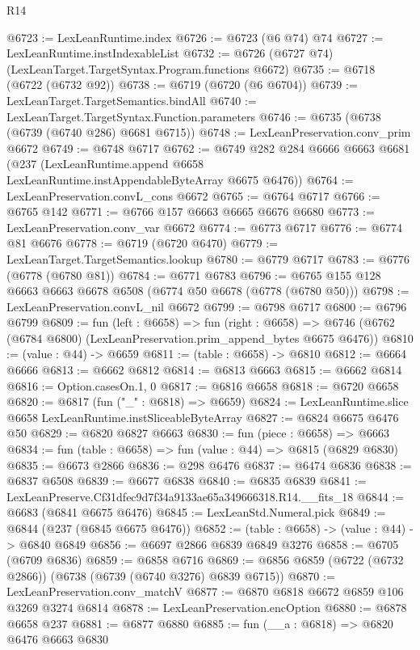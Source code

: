 \begin{lexlean}{R14}
\begin{coremodule}
@6723 := LexLeanRuntime.index
@6726 := @6723 (@6 @74) @74
@6727 := LexLeanRuntime.instIndexableList
@6732 := @6726 (@6727 @74) (LexLeanTarget.TargetSyntax.Program.functions @6672)
@6735 := @6718 (@6722 (@6732 @92))
@6738 := @6719 (@6720 (@6 @6704))
@6739 := LexLeanTarget.TargetSemantics.bindAll
@6740 := LexLeanTarget.TargetSyntax.Function.parameters
@6746 := @6735 (@6738 (@6739 (@6740 @286) @6681 @6715))
@6748 := LexLeanPreservation.conv_prim @6672
@6749 := @6748 @6717
@6762 := @6749
    @282
    @284
    @6666
    @6663
    @6681
    (@237 (LexLeanRuntime.append @6658 LexLeanRuntime.instAppendableByteArray @6675 @6476))
@6764 := LexLeanPreservation.convL_cons @6672
@6765 := @6764 @6717
@6766 := @6765 @142
@6771 := @6766 @157 @6663 @6665 @6676 @6680
@6773 := LexLeanPreservation.conv_var @6672
@6774 := @6773 @6717
@6776 := @6774 @81 @6676
@6778 := @6719 (@6720 @6470)
@6779 := LexLeanTarget.TargetSemantics.lookup
@6780 := @6779 @6717
@6783 := @6776 (@6778 (@6780 @81))
@6784 := @6771 @6783
@6796 := @6765 @155 @128 @6663 @6663 @6678 @6508 (@6774 @50 @6678 (@6778 (@6780 @50)))
@6798 := LexLeanPreservation.convL_nil @6672
@6799 := @6798 @6717
@6800 := @6796 @6799
@6809 := fun (left : @6658) =>
  fun (right : @6658) =>
  @6746 (@6762 (@6784 @6800) (LexLeanPreservation.prim_append_bytes @6675 @6476))
@6810 := (value : @44) -> @6659
@6811 := (table : @6658) -> @6810
@6812 := @6664 @6666
@6813 := @6662 @6812
@6814 := @6813 @6663
@6815 := @6662 @6814
@6816 := Option.casesOn.{1, 0}
@6817 := @6816 @6658
@6818 := @6720 @6658
@6820 := @6817 (fun ("_" : @6818) => @6659)
@6824 := LexLeanRuntime.slice @6658 LexLeanRuntime.instSliceableByteArray
@6827 := @6824 @6675 @6476 @50
@6829 := @6820 @6827 @6663
@6830 := fun (piece : @6658) => @6663
@6834 := fun (table : @6658) => fun (value : @44) => @6815 (@6829 @6830)
@6835 := @6673 @2866
@6836 := @298 @6476
@6837 := @6474 @6836
@6838 := @6837 @6508
@6839 := @6677 @6838
@6840 := @6835 @6839
@6841 := LexLeanPreserve.Cf31dfec9d7f34a9133ae65a349666318.R14.__fits_18
@6844 := @6683 (@6841 @6675 @6476)
@6845 := LexLeanStd.Numeral.pick
@6849 := @6844 (@237 (@6845 @6675 @6476))
@6852 := (table : @6658) -> (value : @44) -> @6840 @6849
@6856 := @6697 @2866 @6839 @6849 @3276
@6858 := @6705 (@6709 @6836)
@6859 := @6858 @6716
@6869 := @6856 @6859 (@6722 (@6732 @2866)) (@6738 (@6739 (@6740 @3276) @6839 @6715))
@6870 := LexLeanPreservation.conv_matchV
@6877 := @6870 @6818 @6672 @6859 @106 @3269 @3274 @6814
@6878 := LexLeanPreservation.encOption
@6880 := @6878 @6658 @237
@6881 := @6877 @6880
@6885 := fun (__a : @6818) => @6820 @6476 @6663 @6830

\end{coremodule}
\end{lexlean}
